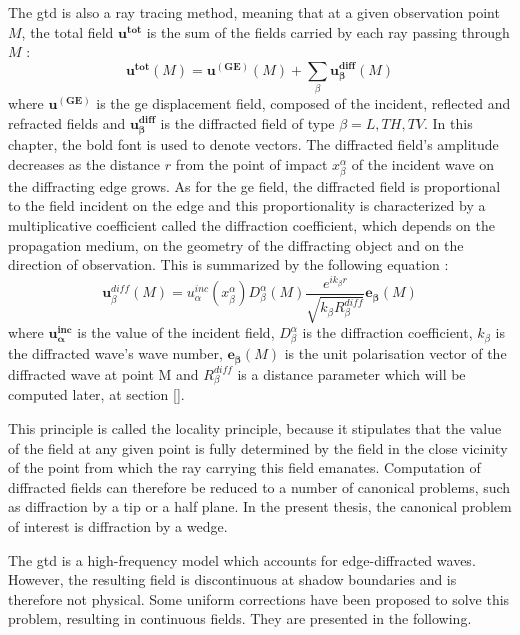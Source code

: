 The \acrshort{gtd} is also a ray tracing method, meaning that at a given observation point $M$, the total field $\mathbf{u^{tot}}$ is the sum of the fields carried by each ray passing through $M$ :
\begin{equation}
    \mathbf{u^{tot}}(M)=\mathbf{u^{(GE)}}(M)+\sum_{\beta} \mathbf{u^{diff}_{\beta}}(M)
\end{equation}
where $\mathbf{u^{(GE)}}$ is the \acrshort{ge} displacement field, composed of the incident, reflected and refracted fields and $\mathbf{u^{diff}_{\beta}}$ is the diffracted field of type $\beta=L,TH,TV$. In this chapter, the bold font is used to denote vectors. The diffracted field's amplitude decreases as the distance $r$ from the point of impact $x_{\beta}^{\alpha}$ of the incident wave on the diffracting edge grows. As for the \acrshort{ge} field, the diffracted field is proportional to the field incident on the edge and this proportionality is characterized by a multiplicative coefficient called the diffraction coefficient, which depends on the propagation medium, on the geometry of the diffracting object and on the direction of observation. This is summarized by the following equation :
\begin{equation}
    \mathbf{u}_{\beta}^{diff}(M)=u_{\alpha}^{inc}(x_{\beta}^{\alpha})D_{\beta}^{\alpha}(M)\dfrac{e^{ik_{\beta}r}}{\sqrt{k_{\beta}R_{\beta}^{diff}}}\mathbf{e_{\beta}}(M)
\end{equation}
where $\mathbf{u_{\alpha}^{inc}}$ is the value of the incident field, $D_{\beta}^{\alpha}$ is the diffraction coefficient, $k_{\beta}$ is the diffracted wave's wave number, $\mathbf{e_{\beta}}(M)$ is the unit polarisation vector of the diffracted wave at point M and $R_{\beta}^{diff}$ is a distance parameter which will be computed later, at section \ref{}.

This principle is called the locality principle, because it stipulates that the value of the field at any given point is fully determined by the field in the close vicinity of the point from which the ray carrying this field emanates. Computation of diffracted fields can therefore be reduced to a number of canonical problems, such as diffraction by a tip or a half plane. In the present thesis, the canonical problem of interest is diffraction by a wedge.

The \acrshort{gtd} is a high-frequency model which accounts for edge-diffracted waves. However, the resulting field is discontinuous at shadow boundaries and is therefore not physical. Some uniform corrections have been proposed to solve this problem, resulting in continuous fields. They are presented in the following. 

